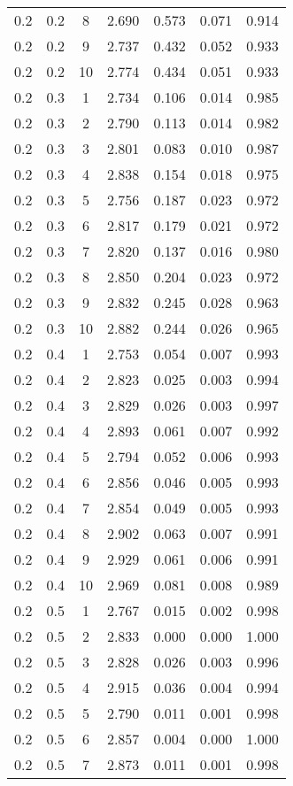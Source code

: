 \begin{tabular}{|c|c|c|c|c|c|c|}
0.2 & 0.2 & 8 & 2.690 & 0.573 & 0.071 & 0.914 \\
0.2 & 0.2 & 9 & 2.737 & 0.432 & 0.052 & 0.933 \\
0.2 & 0.2 & 10 & 2.774 & 0.434 & 0.051 & 0.933 \\
0.2 & 0.3 & 1 & 2.734 & 0.106 & 0.014 & 0.985 \\
0.2 & 0.3 & 2 & 2.790 & 0.113 & 0.014 & 0.982 \\
0.2 & 0.3 & 3 & 2.801 & 0.083 & 0.010 & 0.987 \\
0.2 & 0.3 & 4 & 2.838 & 0.154 & 0.018 & 0.975 \\
0.2 & 0.3 & 5 & 2.756 & 0.187 & 0.023 & 0.972 \\
0.2 & 0.3 & 6 & 2.817 & 0.179 & 0.021 & 0.972 \\
0.2 & 0.3 & 7 & 2.820 & 0.137 & 0.016 & 0.980 \\
0.2 & 0.3 & 8 & 2.850 & 0.204 & 0.023 & 0.972 \\
0.2 & 0.3 & 9 & 2.832 & 0.245 & 0.028 & 0.963 \\
0.2 & 0.3 & 10 & 2.882 & 0.244 & 0.026 & 0.965 \\
0.2 & 0.4 & 1 & 2.753 & 0.054 & 0.007 & 0.993 \\
0.2 & 0.4 & 2 & 2.823 & 0.025 & 0.003 & 0.994 \\
0.2 & 0.4 & 3 & 2.829 & 0.026 & 0.003 & 0.997 \\
0.2 & 0.4 & 4 & 2.893 & 0.061 & 0.007 & 0.992 \\
0.2 & 0.4 & 5 & 2.794 & 0.052 & 0.006 & 0.993 \\
0.2 & 0.4 & 6 & 2.856 & 0.046 & 0.005 & 0.993 \\
0.2 & 0.4 & 7 & 2.854 & 0.049 & 0.005 & 0.993 \\
0.2 & 0.4 & 8 & 2.902 & 0.063 & 0.007 & 0.991 \\
0.2 & 0.4 & 9 & 2.929 & 0.061 & 0.006 & 0.991 \\
0.2 & 0.4 & 10 & 2.969 & 0.081 & 0.008 & 0.989 \\
0.2 & 0.5 & 1 & 2.767 & 0.015 & 0.002 & 0.998 \\
0.2 & 0.5 & 2 & 2.833 & 0.000 & 0.000 & 1.000 \\
0.2 & 0.5 & 3 & 2.828 & 0.026 & 0.003 & 0.996 \\
0.2 & 0.5 & 4 & 2.915 & 0.036 & 0.004 & 0.994 \\
0.2 & 0.5 & 5 & 2.790 & 0.011 & 0.001 & 0.998 \\
0.2 & 0.5 & 6 & 2.857 & 0.004 & 0.000 & 1.000 \\
0.2 & 0.5 & 7 & 2.873 & 0.011 & 0.001 & 0.998 \\

\end{tabular}
